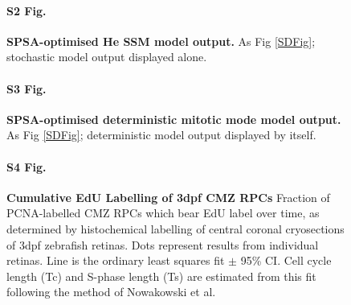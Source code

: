 \begin{figure}[p]
\paragraph{S2 Fig.}
\label{stochasticSupplement}
{\bf SPSA-optimised He SSM model output.} As Fig \ref{SDFig}; stochastic model output displayed alone.
\end{figure}

\begin{figure}[p]
\paragraph{S3 Fig.}
\label{deterministicSupplement}
{\bf SPSA-optimised deterministic mitotic mode model output.} As Fig \ref{SDFig}; deterministic model output displayed by itself.
\end{figure}

\begin{figure}[h]
\paragraph{S4 Fig.}
\label{cumulativeSupplement}
{\bf Cumulative EdU Labelling of 3dpf CMZ RPCs} Fraction of PCNA-labelled CMZ RPCs which bear EdU label over time, as determined by histochemical labelling of central coronal cryosections of 3dpf zebrafish retinas. Dots represent results from individual retinas. Line is the ordinary least squares fit $\pm$ 95\% CI. Cell cycle length (Tc) and S-phase length (Ts) are estimated from this fit following the method of Nowakowski et al.\cite{Nowakowski1989}
\end{figure}